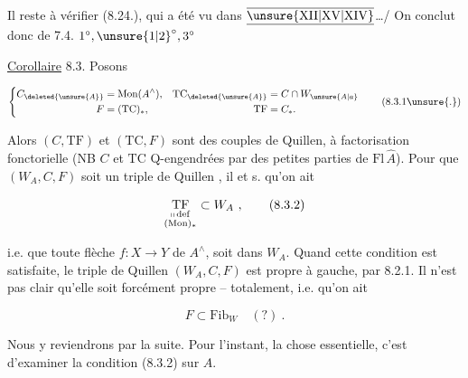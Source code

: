 
Il reste à vérifier (8.24.), qui a été vu dans $\overline{\underline{\unsure{\mathrm{XII}|\mathrm{XV}|\mathrm{XIV}}}}$\ldots\quad / On conclut donc de 7.4. $1^\circ,\unsure{1|2}^\circ,3^\circ$

\uline{Corollaire} 8.3. Posons \unsure{\S|$\xi$}

\[
 \left\{\begin{aligned}
 C_{\deleted{\unsure{A}}}&=\mathrm{Mon}(A^\wedge),&
 \mathrm{TC}_{\deleted{\unsure{A}}}&=C\cap W_{\unsure{A|a}}\\
 F&=(\mathrm{TC})_\ast,&\mathrm{TF}&=C_\ast.
 \end{aligned}\right.
 \tag*{(8.3.1\unsure{.})}
\]

Alors $(C,\mathrm{TF})$ et $(\mathrm{TC},F)$ sont des couples
de Quillen, à factorisation fonctorielle (NB
$C$ et $\mathrm{TC}$   Q-engendrées  par des
petites parties de $\mathrm{Fl}\,\widehat A$). Pour que
$(W_A,C,F)$ soit un triple de Quillen ,
il  et s. qu'on ait

\[
 \underset{\substack{\shortparallel\,\mathrm{def}\\(\mathrm{Mon})_\ast}}{\mathrm{TF}}\subset W_A\ ,
 \tag*{(8.3.2)}
\]

 i.e.  que toute flèche $f:X\to Y$ 
de $A^\wedge$,  soit dans $W_A$.
Quand cette condition est satisfaite, le triple de Quillen $(W_A,C,F)$ est propre à gauche, par 8.2.1.
Il n'est pas clair qu'elle soit forcément propre -- totalement, i.e. qu'on ait

\[
 F\subset\mathrm{Fib}_{W}\quad (?)\ .
 \tag*{(8.3.3)}
\]

Nous y reviendrons par la suite. Pour l'instant, la chose essentielle, c'est d'examiner la condition (8.3.2) sur $A$.
